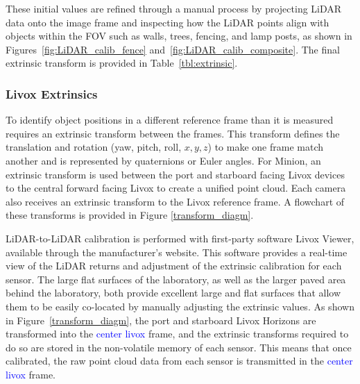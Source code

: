 \documentclass{erauthesis}
\begin{document}
These initial values are refined through a manual process by projecting LiDAR data onto the image frame and inspecting how the LiDAR points align with objects within the \ac{FOV} such as walls, trees, fencing, and lamp posts, as shown in Figures~\ref{fig:LiDAR_calib_fence} and~\ref{fig:LiDAR_calib_composite}.
The final extrinsic transform is provided in Table~\ref{tbl:extrinsic}.

            
\subsubsection{Livox Extrinsics} \label{lidar_extrinsic}
To identify object positions in a different reference frame than it is measured requires an extrinsic transform between the frames. 
This transform defines the translation and rotation (yaw, pitch, roll, $x,y,z$) to make one frame match another and is represented by quaternions or Euler angles.
For Minion, an extrinsic transform is used between the port and starboard facing Livox devices to the central forward facing Livox to create a unified point cloud. Each camera also receives an extrinsic transform to the Livox reference frame.
A flowchart of these transforms is provided in Figure \ref{transform_diagm}.



LiDAR-to-LiDAR calibration is performed with first-party software Livox Viewer, available through the manufacturer's website.
This software provides a real-time view of the LiDAR returns and adjustment of the extrinsic calibration for each sensor.
The large flat surfaces of the laboratory, as well as the larger paved area behind the laboratory, both provide excellent large and flat surfaces that allow them to be easily co-located by manually adjusting the extrinsic values.
As shown in Figure~\ref{transform_diagm}, the port and starboard Livox Horizons are transformed into the \textcolor{blue}{center livox} frame, and the extrinsic transforms required to do so are stored in the non-volatile memory of each sensor. This means that once calibrated, the raw point cloud data from each sensor is transmitted in the \textcolor{blue}{center livox} frame.
\end{document}
